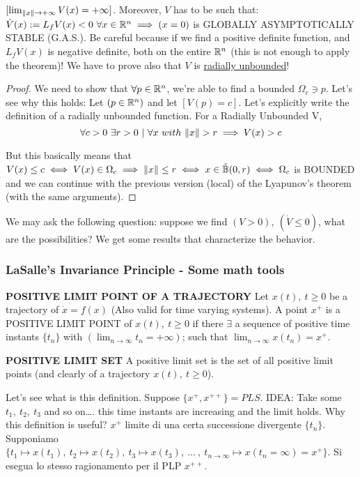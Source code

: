 $[\lim_{\lVert x\rVert\to +\infty}{V(x)} = +\infty]$. Moreover, $V$ has to be such that: $\dot{V}(x) := L_fV(x) < 0\ \forall x \in \mathbb{R}^n \implies (x=0)$ is GLOBALLY ASYMPTOTICALLY STABLE (G.A.S.). 
Be careful because if we find a positive definite function, and $L_fV(x)$ is negative definite, both on the entire $\mathbb{R}^n$ (this is not enough to apply the theorem)! We have to prove also that $V$ is \underline{radially unbounded}!

\begin{proof}
We need to show that $\forall p \in \mathbb{R}^n$, we're able to find a bounded $\Omega_c \ni p$. Let's see why this holds:
Let $(p \in \mathbb{R}^n)$ and let $[V(p) = c]$. Let's explicitly write the definition of a radially unbounded function. For a Radially Unbounded V,
\[
	\forall c > 0\ \exists r > 0\ |\ \forall x\ with\ \lVert x\rVert > r \implies V(x) > c
\]

But this basically means that $V(x) \leq c \iff V(x) \in \Omega_c \implies \lVert x\rVert \leq r \iff x \in \mathring{\mathbb{B}}(0,r) \iff \Omega_c$ is BOUNDED and we can continue with the previous version (local) of the Lyapunov's theorem (with the same arguments).

\end{proof}

We may ask the following question: suppose we find $(V > 0),\ (\dot{V} \leq 0)$, what are the possibilities? We get some results that characterize the behavior.

\subsubsection{LaSalle's Invariance Principle - Some math tools}

\begin{defn}{\textbf{POSITIVE LIMIT POINT OF A TRAJECTORY}}
Let $x(t),\ t \geq 0$ be a trajectory of $\dot{x}=f(x)$ (Also valid for time varying systems). A point $x^+$ is a POSITIVE LIMIT POINT of $x(t),\ t \geq 0$ if there $\exists$ a sequence of positive time instants $\{t_n\}$ with $(\lim_{n\to\infty}{t_n} = +\infty)$; such that $\lim_{n\to\infty}{x(t_n)} = x^+$.
\end{defn}

\begin{defn}{\textbf{POSITIVE LIMIT SET}}
A positive limit set is the set of all positive limit points (and clearly of a trajectory $x(t),\ t \geq 0$).
\end{defn}

Let's see what is this definition. Suppose $\{x^+,x^{++}\} = PLS$. IDEA: Take some $t_1,\ t_2,\ t_3$ and so on\dots. this time instants are increasing and the limit holds. Why this definition is useful? $x^+$ limite di una certa successione divergente $\{t_n\}$. Supponiamo $\{t_1 \mapsto x(t_1),\ t_2 \mapsto x(t_2),\ t_3 \mapsto x(t_3),\ \dots\ ,\ t_{n\to\infty} \mapsto x(t_n = \infty)=x^+\}$. Si esegua lo stesso ragionamento per il PLP $x^{++}$.

